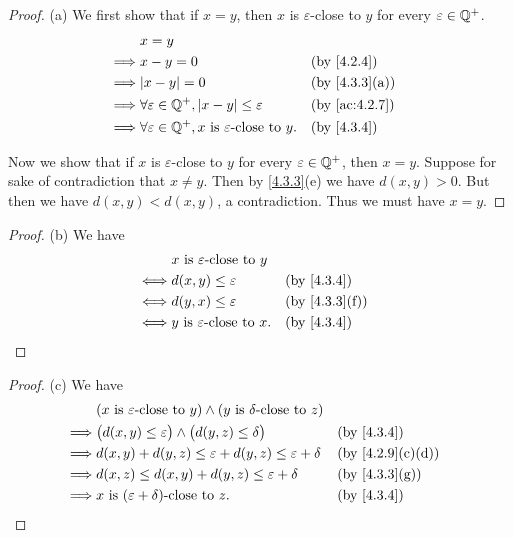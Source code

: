 \begin{proof}{(a)}
  We first show that if \(x = y\), then \(x\) is \(\varepsilon\)-close to \(y\) for every \(\varepsilon \in \mathbb{Q}^+\).
  \begin{align*}
             & x = y                                                                                                    \\
    \implies & x - y = 0                                                               &  & \by{4.2.4}                  \\
    \implies & \abs{x - y} = 0                                                         &  & \text{(by \cref{4.3.3}(a))} \\
    \implies & \forall \varepsilon \in \Q^+, \abs{x - y} \leq \varepsilon              &  & \by{ac:4.2.7}               \\
    \implies & \forall \varepsilon \in \Q^+, x \text{ is \(\varepsilon\)-close to } y. &  & \by{4.3.4}
  \end{align*}

  Now we show that if \(x\) is \(\varepsilon\)-close to \(y\) for every \(\varepsilon \in \mathbb{Q}^+\), then \(x = y\).
  Suppose for sake of contradiction that \(x \neq y\).
  Then by \cref{4.3.3}(e) we have \(d(x, y) > 0\).
  But then we have \(d(x, y) < d(x, y)\), a contradiction.
  Thus we must have \(x = y\).
\end{proof}

\begin{proof}{(b)}
  We have
  \begin{align*}
         & x \text{ is \(\varepsilon\)-close to } y                                   \\
    \iff & d(x, y) \leq \varepsilon                  &  & \by{4.3.4}                  \\
    \iff & d(y, x) \leq \varepsilon                  &  & \text{(by \cref{4.3.3}(f))} \\
    \iff & y \text{ is \(\varepsilon\)-close to } x. &  & \by{4.3.4}
  \end{align*}
\end{proof}

\begin{proof}{(c)}
  We have
  \begin{align*}
             & (x \text{ is \(\varepsilon\)-close to } y) \land (y \text{ is \(\delta\)-close to } z)                                     \\
    \implies & \big(d(x, y) \leq \varepsilon\big) \land \big(d(y, z) \leq \delta\big)                 &  & \by{4.3.4}                     \\
    \implies & d(x, y) + d(y, z) \leq \varepsilon + d(y, z) \leq \varepsilon + \delta                 &  & \text{(by \cref{4.2.9}(c)(d))} \\
    \implies & d(x, z) \leq d(x, y) + d(y, z) \leq \varepsilon + \delta                               &  & \text{(by \cref{4.3.3}(g))}    \\
    \implies & x \text{ is \((\varepsilon + \delta)\)-close to } z.                                   &  & \by{4.3.4}
  \end{align*}
\end{proof}

